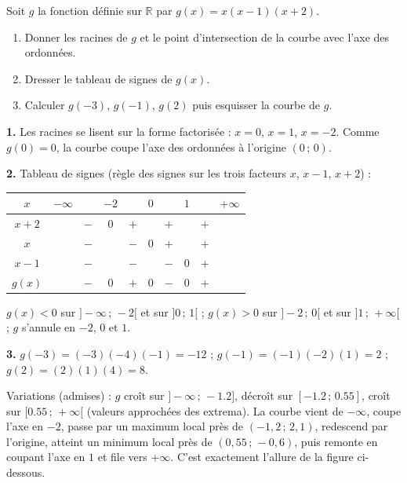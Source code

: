 \documentclass[11pt]{article}
\begin{document}
\begin{exercice}
Soit $g$ la fonction définie sur $\mathbb{R}$ par $g(x) = x(x - 1)(x + 2)$.
\begin{enumerate}
\item Donner les racines de $g$ et le point d'intersection de la courbe avec l'axe des ordonnées.
\item Dresser le tableau de signes de $g(x)$.
\item Calculer $g(-3)$, $g(-1)$, $g(2)$ puis esquisser la courbe de $g$.
\end{enumerate}
\end{exercice}

\begin{corrige}[Exercice 1]
\textbf{1.} Les racines se lisent sur la forme factorisée : $x = 0$, $x = 1$, $x = -2$. Comme $g(0) = 0$, la courbe coupe l'axe des ordonnées à l'origine $(0\,;\,0)$.

\textbf{2.} Tableau de signes (règle des signes sur les trois facteurs $x$, $x-1$, $x+2$) :

\begin{center}
\begin{tabular}{|c|ccccccccc|}
\hline
$x$ & $-\infty$ & & $-2$ & & $0$ & & $1$ & & $+\infty$ \\
\hline
$x + 2$ & & $-$ & $0$ & $+$ & & $+$ & & $+$ & \\
\hline
$x$ & & $-$ & & $-$ & $0$ & $+$ & & $+$ & \\
\hline
$x - 1$ & & $-$ & & $-$ & & $-$ & $0$ & $+$ & \\
\hline
$g(x)$ & & $-$ & $0$ & $+$ & $0$ & $-$ & $0$ & $+$ & \\
\hline
\end{tabular}
\end{center}

$g(x) < 0$ sur $]-\infty\,;\,-2[$ et sur $]0\,;\,1[$ ; $g(x) > 0$ sur $]-2\,;\,0[$ et sur $]1\,;\,+\infty[$ ; $g$ s'annule en $-2$, $0$ et $1$.

\textbf{3.} $g(-3) = (-3)(-4)(-1) = -12$ ; $g(-1) = (-1)(-2)(1) = 2$ ; $g(2) = (2)(1)(4) = 8$. 

Variations (admises) : $g$ croît sur $]-\infty\,;\,-1.2]$, décroît sur $[-1.2\,;\,0.55]$, croît sur $[0.55\,;\,+\infty[$ (valeurs approchées des extrema). La courbe vient de $-\infty$, coupe l'axe en $-2$, passe par un maximum local près de $(-1{,}2\,;\,2{,}1)$, redescend par l'origine, atteint un minimum local près de $(0{,}55\,;\,-0{,}6)$, puis remonte en coupant l'axe en $1$ et file vers $+\infty$. C'est exactement l'allure de la figure ci-dessous.
\end{corrige}
\end{document}
